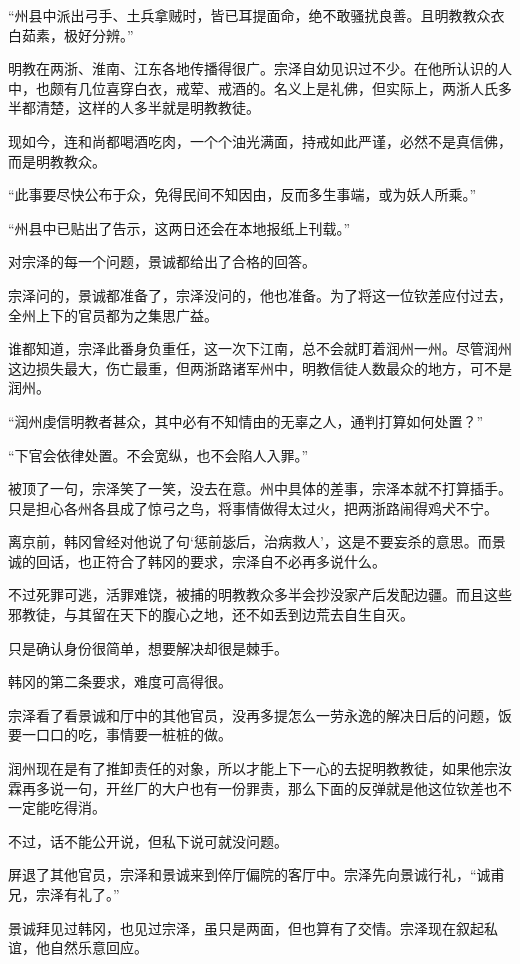“州县中派出弓手、土兵拿贼时，皆已耳提面命，绝不敢骚扰良善。且明教教众衣白茹素，极好分辨。”

明教在两浙、淮南、江东各地传播得很广。宗泽自幼见识过不少。在他所认识的人中，也颇有几位喜穿白衣，戒荤、戒酒的。名义上是礼佛，但实际上，两浙人氏多半都清楚，这样的人多半就是明教教徒。

现如今，连和尚都喝酒吃肉，一个个油光满面，持戒如此严谨，必然不是真信佛，而是明教教众。

“此事要尽快公布于众，免得民间不知因由，反而多生事端，或为妖人所乘。”

“州县中已贴出了告示，这两日还会在本地报纸上刊载。”

对宗泽的每一个问题，景诚都给出了合格的回答。

宗泽问的，景诚都准备了，宗泽没问的，他也准备。为了将这一位钦差应付过去，全州上下的官员都为之集思广益。

谁都知道，宗泽此番身负重任，这一次下江南，总不会就盯着润州一州。尽管润州这边损失最大，伤亡最重，但两浙路诸军州中，明教信徒人数最众的地方，可不是润州。

“润州虔信明教者甚众，其中必有不知情由的无辜之人，通判打算如何处置？”

“下官会依律处置。不会宽纵，也不会陷人入罪。”

被顶了一句，宗泽笑了一笑，没去在意。州中具体的差事，宗泽本就不打算插手。只是担心各州各县成了惊弓之鸟，将事情做得太过火，把两浙路闹得鸡犬不宁。

离京前，韩冈曾经对他说了句‘惩前毖后，治病救人’，这是不要妄杀的意思。而景诚的回话，也正符合了韩冈的要求，宗泽自不必再多说什么。

不过死罪可逃，活罪难饶，被捕的明教教众多半会抄没家产后发配边疆。而且这些邪教徒，与其留在天下的腹心之地，还不如丢到边荒去自生自灭。

只是确认身份很简单，想要解决却很是棘手。

韩冈的第二条要求，难度可高得很。

宗泽看了看景诚和厅中的其他官员，没再多提怎么一劳永逸的解决日后的问题，饭要一口口的吃，事情要一桩桩的做。

润州现在是有了推卸责任的对象，所以才能上下一心的去捉明教教徒，如果他宗汝霖再多说一句，开丝厂的大户也有一份罪责，那么下面的反弹就是他这位钦差也不一定能吃得消。

不过，话不能公开说，但私下说可就没问题。

屏退了其他官员，宗泽和景诚来到倅厅偏院的客厅中。宗泽先向景诚行礼，“诚甫兄，宗泽有礼了。”

景诚拜见过韩冈，也见过宗泽，虽只是两面，但也算有了交情。宗泽现在叙起私谊，他自然乐意回应。

